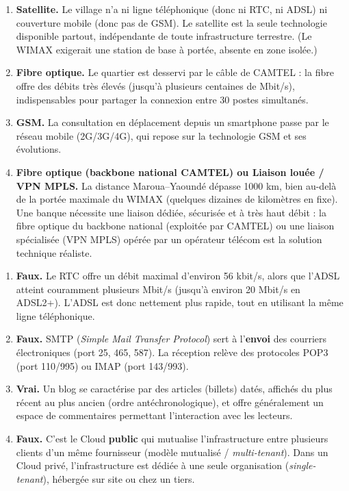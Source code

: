 \documentclass[11pt]{article}
\begin{document}
\begin{corrige}
\begin{enumerate}
    \item \textbf{Satellite.} Le village n'a ni ligne téléphonique (donc ni RTC, ni ADSL) ni couverture mobile (donc pas de GSM). Le satellite est la seule technologie disponible partout, indépendante de toute infrastructure terrestre. (Le WIMAX exigerait une station de base à portée, absente en zone isolée.)
    \item \textbf{Fibre optique.} Le quartier est desservi par le câble de CAMTEL : la fibre offre des débits très élevés (jusqu'à plusieurs centaines de Mbit/s), indispensables pour partager la connexion entre 30 postes simultanés.
    \item \textbf{GSM.} La consultation en déplacement depuis un smartphone passe par le réseau mobile (2G/3G/4G), qui repose sur la technologie GSM et ses évolutions.
    \item \textbf{Fibre optique (backbone national CAMTEL) ou Liaison louée / VPN MPLS.} La distance Maroua--Yaoundé dépasse 1000 km, bien au-delà de la portée maximale du WIMAX (quelques dizaines de kilomètres en fixe). Une banque nécessite une liaison dédiée, sécurisée et à très haut débit : la fibre optique du backbone national (exploitée par CAMTEL) ou une liaison spécialisée (VPN MPLS) opérée par un opérateur télécom est la solution technique réaliste.
\end{enumerate}
\end{corrige}

\begin{corrige}
\begin{enumerate}
    \item \textbf{Faux.} Le RTC offre un débit maximal d'environ 56 kbit/s, alors que l'ADSL atteint couramment plusieurs Mbit/s (jusqu'à environ 20 Mbit/s en ADSL2+). L'ADSL est donc nettement plus rapide, tout en utilisant la même ligne téléphonique.
    \item \textbf{Faux.} SMTP (\emph{Simple Mail Transfer Protocol}) sert à l'\textbf{envoi} des courriers électroniques (port 25, 465, 587). La réception relève des protocoles POP3 (port 110/995) ou IMAP (port 143/993).
    \item \textbf{Vrai.} Un blog se caractérise par des articles (billets) datés, affichés du plus récent au plus ancien (ordre antéchronologique), et offre généralement un espace de commentaires permettant l'interaction avec les lecteurs.
    \item \textbf{Faux.} C'est le Cloud \textbf{public} qui mutualise l'infrastructure entre plusieurs clients d'un même fournisseur (modèle mutualisé / \emph{multi-tenant}). Dans un Cloud privé, l'infrastructure est dédiée à une seule organisation (\emph{single-tenant}), hébergée sur site ou chez un tiers.
\end{enumerate}
\end{corrige}
\end{document}

